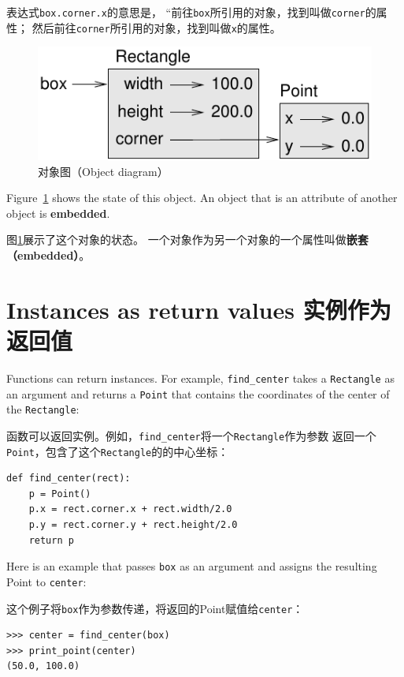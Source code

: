 \documentclass[10pt]{book}
\begin{document}
\begin{CJK}{UTF8}{gbsn}
表达式{\tt box.corner.x}的意思是，
``前往{\tt box}所引用的对象，找到叫做{\tt corner}的属性；
然后前往{\tt corner}所引用的对象，找到叫做{\tt x}的属性。

\begin{figure}
\centerline
{\includegraphics[scale=0.8]{figs/rectangle.pdf}}
\caption{对象图（Object diagram）}
\label{fig.rectangle}
\end{figure}


Figure~\ref{fig.rectangle} shows the state of this object.
An object that is an attribute of another object is {\bf embedded}.

图\ref{fig.rectangle}展示了这个对象的状态。
一个对象作为另一个对象的一个属性叫做{\bf 嵌套（embedded）}。

\section{Instances as return values 实例作为返回值}

Functions can return instances.  For example, \verb"find_center"
takes a {\tt Rectangle} as an argument and returns a {\tt Point}
that contains the coordinates of the center of the {\tt Rectangle}:

函数可以返回实例。例如，\verb"find_center"将一个{\tt Rectangle}作为参数
返回一个{\tt Point}，包含了这个{\tt Rectangle}的的中心坐标：

\begin{verbatim}
def find_center(rect):
    p = Point()
    p.x = rect.corner.x + rect.width/2.0
    p.y = rect.corner.y + rect.height/2.0
    return p
\end{verbatim}
%
Here is an example that passes {\tt box} as an argument and assigns
the resulting Point to {\tt center}:

这个例子将{\tt box}作为参数传递，将返回的Point赋值给{\tt center}：

\begin{verbatim}
>>> center = find_center(box)
>>> print_point(center)
(50.0, 100.0)
\end{verbatim}
%


\end{CJK}
\end{document}
